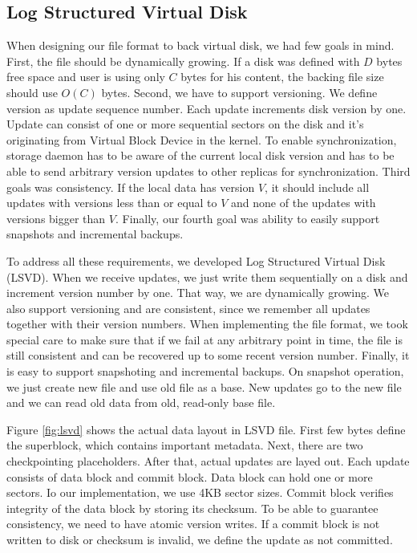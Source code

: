 \subsection{Log Structured Virtual Disk}
\label{sec:lsvd}

When designing our file format to back virtual disk, we had few goals in mind. First, the file should be dynamically growing. If a disk was defined with $D$ bytes free space and user is using only $C$ bytes for his content, the backing file size should use $O(C)$ bytes. Second, we have to support versioning. We define version as update sequence number. Each update increments disk version by one. Update can consist of one or more sequential sectors on the disk and it's originating from Virtual Block Device in the kernel. To enable synchronization, storage daemon has to be aware of the current local disk version and has to be able to send arbitrary version updates to other replicas for synchronization. Third goals was consistency. If the local data has version $V$, it should include all updates with versions less than or equal to $V$ and none of the updates with versions bigger than $V$. Finally, our fourth goal was ability to easily support snapshots and incremental backups.

To address all these requirements, we developed Log Structured Virtual Disk (LSVD). When we receive updates, we just write them sequentially on a disk and increment version number by one. That way, we are dynamically growing. We also support versioning and are consistent, since we remember all updates together with their version numbers. When implementing the file format, we took special care to make sure that if we fail at any arbitrary point in time, the file is still consistent and can be recovered up to some recent version number. Finally, it is easy to support snapshoting and incremental backups. On snapshot operation, we just create new file and use old file as a base. New updates go to the new file and we can read old data from old, read-only base file. 

Figure \ref{fig:lsvd} shows the actual data layout in LSVD file. First few bytes define the superblock, which contains important metadata. Next, there are two checkpointing placeholders. After that, actual updates are layed out. Each update consists of data block and commit block. Data block can hold one or more sectors. Io our implementation, we use 4KB sector sizes. Commit block verifies integrity of the data block by storing its checksum. To be able to guarantee consistency, we need to have atomic version writes. If a commit block is not written to disk or checksum is invalid, we define the update as not committed.

